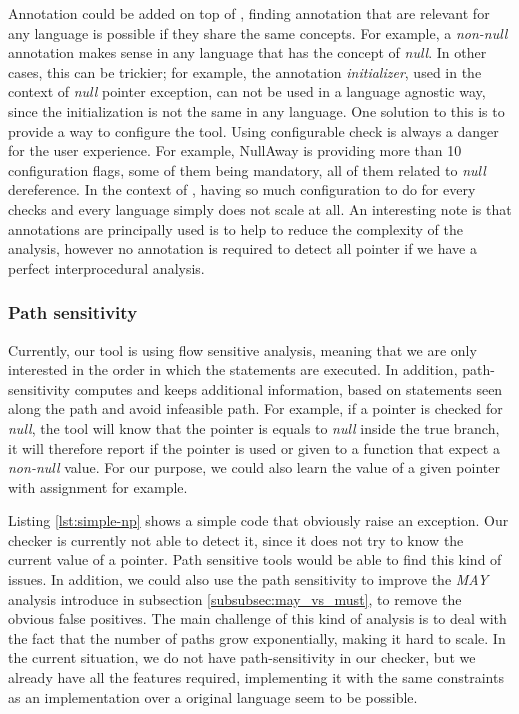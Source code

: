 Annotation could be added on top of \slang{}, finding annotation that are relevant for any language is possible if they share the same concepts. 
For example, a \emph{non-null} annotation makes sense in any language that has the concept of \emph{null}. 
In other cases, this can be trickier; for example, the annotation \emph{initializer}, used in the context of \emph{null} pointer exception, can not be used in a language agnostic way, since the initialization is not the same in any language.\newline
One solution to this is to provide a way to configure the tool. 
Using configurable check is always a danger for the user experience. For example, NullAway is providing more than 10 configuration flags, some of them being mandatory, all of them related to \emph{null} dereference. 
In the context of \slang{}, having so much configuration to do for every checks and every language simply does not scale at all.\newline
An interesting note is that annotations are principally used is to help to reduce the complexity of the analysis, however no annotation is required to detect all pointer if we have a perfect interprocedural analysis.

\subsubsection{Path sensitivity}
\label{subsubsec:path_sensitivity}

Currently, our tool is using flow sensitive analysis, meaning that we are only interested in the order in which the statements are executed.
In addition, path-sensitivity computes and keeps additional information, based on statements seen along the path and avoid infeasible path. 
For example, if a pointer is checked for \emph{null}, the tool will know that the pointer is equals to \emph{null} inside the true branch, it will therefore report if the pointer is used or given to a function that expect a \emph{non-null} value.
For our purpose, we could also learn the value of a given pointer with assignment for example.



Listing \ref{lst:simple-np} shows a simple code that obviously raise an exception. Our checker is currently not able to detect it, since it does not try to know the current value of a pointer.
Path sensitive tools would be able to find this kind of issues.
In addition, we could also use the path sensitivity to improve the \emph{MAY} analysis introduce in subsection \ref{subsubsec:may_vs_must}, to remove the obvious false positives. 
The main challenge of this kind of analysis is to deal with the fact that the number of paths grow exponentially, making it hard to scale. 
In the current situation, we do not have path-sensitivity in our checker, but we already have all the features required, implementing it with the same constraints as an implementation over a original language seem to be possible.

